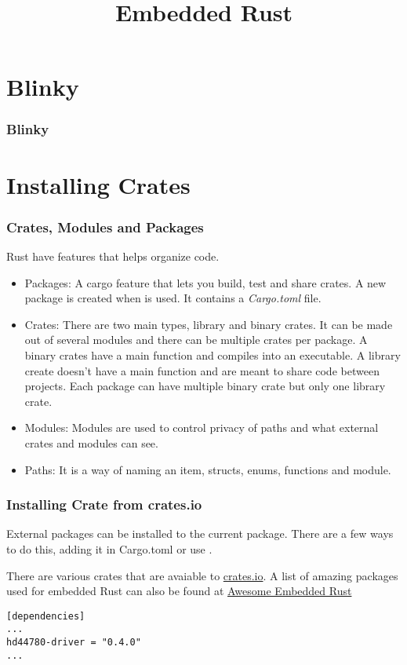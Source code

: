 \documentclass{beamer}
\title{Embedded Rust}
\begin{document}
\begin{frame}
  \titlepage{}
\end{frame}

\section{Blinky}
\begin{frame}
  \frametitle{Blinky}

\end{frame}

\section{Installing Crates}
\begin{frame} \frametitle{Crates, Modules and Packages} Rust have features that helps organize code.

  \begin{itemize}
    \item{Packages: A cargo feature that lets you build, test and share crates. A new package is created when  is used. It contains a \emph{Cargo.toml} file.}
    \item{Crates: There are two main types, library and binary crates. It can be made out of several modules and there can be multiple crates per package. A binary crates have a main function and compiles into an executable. A library create doesn't have a main function and are meant to share code between projects. Each package can have multiple binary crate but only one library crate.}
    \item{Modules: Modules are used to control privacy of paths and what external crates and modules can see.}
    \item{Paths: It is a way of naming an item, structs, enums, functions and module.}
  \end{itemize}
\end{frame}

\begin{frame}[fragile]
  \frametitle{Installing Crate from crates.io}
  External packages can be installed to the current package. There are a few ways to do this, adding it in Cargo.toml or use .

  There are various crates that are avaiable to \href{crates.io}{crates.io}. A list of amazing packages used for embedded Rust can also be found at \href{https://github.com/rust-embedded/awesome-embedded-rust}{Awesome Embedded Rust}

\begin{lstlisting}[caption={Adding Dependencies in Cargo.toml}]
[dependencies]
...
hd44780-driver = "0.4.0"
...
\end{lstlisting}
\end{frame}
\end{document}
